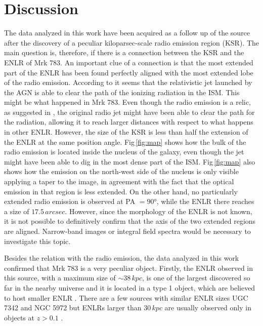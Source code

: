 \documentclass[../thesis.tex]{subfiles}
\begin{document}
\section{Discussion}
\label{sec:pap3_discussion}

The data analyzed in this work have been acquired as a follow up of the source after the discovery of a peculiar kiloparsec-scale radio emission region (KSR).
The main question is, therefore, if there is a connection between the KSR and the ENLR of Mrk 783.
An important clue of a connection is that the most extended part of the ENLR has been found perfectly aligned with the most extended lobe of the radio emission.
According to \citet{Wilson94} it seems that the relativistic jet launched by the AGN is able to clear the path of the ionizing radiation in the ISM.
This might be what happened in Mrk 783.
Even though the radio emission is a relic, as suggested in \citep{Congiu17}, the original radio jet might have been able to clear the path for the radiation, allowing it to reach larger distances with respect to what happens in other ENLR.
However, the size of the KSR is less than half the extension of the ENLR at the same position angle.
Fig\,\ref{fig:map} shows how the bulk of the radio emission is located inside the nucleus of the galaxy, even though the jet might have been able to dig in the most dense part of the ISM.
Fig\,\ref{fig:map} also shows how the emission on the north-west side of the nucleus is only visible applying a taper to the image, in agreement with the fact that the optical emission in that region is less extended.
On the other hand, no particularly extended radio emission is observed at PA $=\ang{90}$, while the ENLR there reaches a size of $17.5\,\si{arcsec}$.
However, since the morphology of the ENLR is not known, it is not possible to definitively confirm that the axis of the two extended regions are aligned.
Narrow-band images or integral field spectra would be necessary to investigate this topic.


Besides the relation with the radio emission, the data analyzed in this work confirmed that Mrk 783 is a very peculiar object.
Firstly, the ENLR observed in this source, with a maximum size of $\sim 38\,\si{kpc}$, is one of the largest discovered so far in the nearby universe and it is located in a type 1 object, which are believed to host smaller ENLR \citep{Schmitt03b}.
There are a few sources with similar ENLR sizes UGC 7342 and NGC 5972 \citep[$37$ and $33$ kpc respectively][]{Keel12} but ENLRs larger than $30\,\si{kpc}$ are usually observed only in objects at $z>0.1$ \citep[e.g.][]{Stockton87,Humphrey10,Sun18}.
\end{document}
